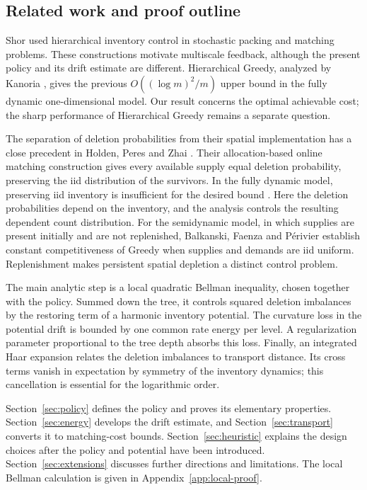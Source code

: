 \documentclass[11pt]{article}
\numberwithin{equation}{section}
\theoremstyle{remark}
\begin{document}
\subsection{Related work and proof outline}

Shor \cite{Shor} used hierarchical inventory control in stochastic packing
and matching problems. These constructions motivate multiscale feedback,
although the present policy and its drift estimate are different.
Hierarchical Greedy, analyzed by Kanoria \cite{Kanoria}, gives the previous
\(O((\log m)^2/m)\) upper bound in the fully dynamic one-dimensional
model. Our result concerns the optimal achievable cost; the sharp
performance of Hierarchical Greedy remains a separate question.

The separation of deletion probabilities from their spatial implementation
has a close precedent in Holden, Peres and Zhai \cite{HPZ}. Their
allocation-based online matching construction gives every available supply
equal deletion probability, preserving the iid distribution of the
survivors. In the fully dynamic model, preserving iid inventory is
insufficient for the desired bound \cite[Section~7.1]{Kanoria}.
Here the deletion probabilities depend on the inventory, and the analysis
controls the resulting dependent count distribution.
For the semidynamic model, in which supplies are present initially and
are not replenished, Balkanski, Faenza and P\'erivier \cite{BFP} establish
constant competitiveness of Greedy when supplies and demands are iid
uniform. Replenishment makes persistent spatial depletion a distinct
control problem.

The main analytic step is a local quadratic Bellman inequality, chosen
together with the policy. Summed down the tree, it controls squared
deletion imbalances by the restoring term of a harmonic inventory
potential. The curvature loss in the potential drift is bounded by one
common rate energy per level. A regularization parameter proportional to
the tree depth absorbs this loss. Finally, an integrated Haar expansion
relates the deletion imbalances to transport distance. Its cross terms
vanish in expectation by symmetry of the inventory dynamics; this
cancellation is essential for the logarithmic order.

Section~\ref{sec:policy} defines the policy and proves its elementary
properties. Section~\ref{sec:energy} develops the drift estimate, and
Section~\ref{sec:transport} converts it to matching-cost bounds.
Section~\ref{sec:heuristic} explains the design choices after the policy
and potential have been introduced. Section~\ref{sec:extensions} discusses
further directions and limitations. The local Bellman calculation is given in
Appendix~\ref{app:local-proof}.
\end{document}
